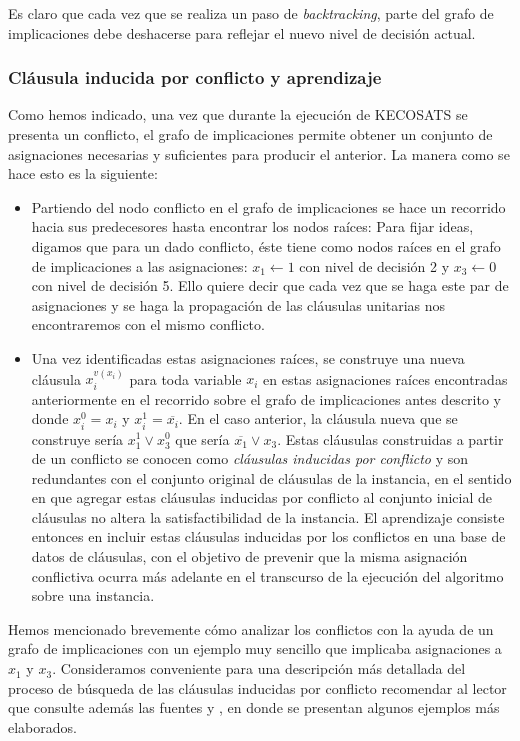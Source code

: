 \documentclass[12pt,lettersize,oneside]{article}
\begin{document}
Es claro que cada vez que se realiza un paso de \emph{backtracking}, parte del
grafo de implicaciones debe deshacerse para reflejar el nuevo nivel de decisión
actual.
\subsubsection{Cláusula inducida por conflicto y aprendizaje}

Como hemos indicado, una vez que durante la ejecución de KECOSATS se presenta un
conflicto, el grafo de implicaciones permite obtener un conjunto de asignaciones
necesarias y suficientes para producir el anterior. La manera como se hace esto
es la siguiente:
\begin{itemize}
\item Partiendo del nodo conflicto en el grafo de implicaciones se hace un
  recorrido hacia sus predecesores hasta encontrar los nodos raíces: Para fijar
  ideas, digamos que para un dado conflicto, éste tiene como nodos raíces en el
  grafo de implicaciones a las asignaciones: $x_1 \gets 1$ con nivel de
  decisión 2 y $x_3 \gets 0$ con nivel de decisión 5. Ello quiere decir que
  cada vez que se haga este par de asignaciones y se haga la propagación de las
  cláusulas unitarias nos encontraremos con el mismo conflicto.

\item Una vez identificadas estas asignaciones raíces, se construye una nueva
  cláusula $x_i^{v(x_i)}$ para toda variable $x_i$ en estas asignaciones raíces
  encontradas anteriormente en el recorrido sobre el grafo de implicaciones
  antes descrito y donde $x_i^0= x_i$ y $x_i^1=\overline{x_i}$. En el caso anterior,
  la cláusula nueva que se construye sería $x_1^{1} \vee x_3^{0}$ que sería
  $\overline{x_1} \vee x_3$. Estas cláusulas construidas a partir de un conflicto se
  conocen como \emph{cláusulas inducidas por conflicto} y son redundantes con el
  conjunto original de cláusulas de la instancia, en el sentido en que agregar
  estas cláusulas inducidas por conflicto al conjunto inicial de cláusulas no
  altera la satisfactibilidad de la instancia. El aprendizaje consiste entonces
  en incluir estas cláusulas inducidas por los conflictos en una base de datos
  de cláusulas, con el objetivo de prevenir que la misma asignación conflictiva
  ocurra más adelante en el transcurso de la ejecución del algoritmo sobre una
  instancia.
\end{itemize}

Hemos mencionado brevemente cómo analizar los conflictos con la ayuda de un
grafo de implicaciones con un ejemplo muy sencillo que implicaba asignaciones a
$x_1$ y $x_3$. Consideramos conveniente para una descripción más detallada del
proceso de búsqueda de las cláusulas inducidas por conflicto recomendar al lector
que consulte además las fuentes \cite{grasp96} y \cite{ZhangThesis}, en donde se
presentan algunos ejemplos más elaborados.
\end{document}
